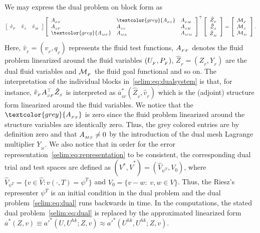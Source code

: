 We may express the dual problem on block form as
\begin{eqnarray}
\label{selim:eq:dualsystem}
\left[\begin{array}{ccc} \hat{v}_{_{F}} & \hat{v}_{_{S}} & \hat{v}_{_{M}}
  \end{array} \right]
\left[\begin{array}{lll} \AFF & \textcolor{grey}{\AFS} & \AFM
    \\ \ASF & \ASS & \ASM \\ \textcolor{grey}{\AMF} & \AMS &
    \AMM
\end{array} \right]^{\top}
\left[ \begin{array}{c} \hat{Z}_{_{F}} \\ \hat{Z}_{_{S}}
    \\ \hat{Z}_{_{M}} \end{array} \right] =\left[ \begin{array}{l}
    \M_{_{F}}\\ \M_{{_S}}\\ \M_{_{M}} \end{array} \right].
\end{eqnarray}
Here, $\hat{v}_{_{F}} = (v_{_{F}}, q_{_{F}})$ represents the fluid
test functions, $A_{_{FF}}$ denotes the fluid problem linearized around the
fluid variables $(U_{_{F}},P_{_{F}})$, $\hat{Z}_{_{F}} = (Z_{_{F}}, Y_{_{F}})$
are the dual fluid variables and $\mathcal{M}_{_{F}}$ the fluid goal functional
and so on. The interpretation of the individual blocks
in~\eqref{selim:eq:dualsystem} is that, for instance,
$\hat{v}_{_{F}}A_{_{SF}}^{\top}\hat{Z}_{_{S}} $ is interpreted as
$\overline{a}^*_{_{SF}}(\hat{Z}_{_{S}}, \hat{v}_{_{F}})$ which is the
(adjoint) structure form linearized around the fluid variables.  We
notice that the $\textcolor{grey}{\AFS}$ is zero since the fluid
problem linearized around the structure variables are identically
zero. Thus, the grey colored entries are by definition zero and that
$A_{_{MS}} \neq 0$ by the introduction of the dual mesh Lagrange multiplier
$Y_{_{M}}$. We also notice that in order for the error
representation~\eqref{selim:eq:representation} to be consistent, the
corresponding dual trial and test spaces are defined as $(V^*,
\hat{V}^*)=(\hat{V}_{\psi^T}, V_0)$, where $\hat{V}_{\psi^T} = \{v\in
\hat{V} : v(\cdot, T) = \psi^T \}$ and $V_0 = \{v-w:\;v,w\in V
\}$. Thus, the Riesz's representer $\psi^T$ is an initial condition in
the dual problem and the dual problem~\eqref{selim:eq:dual} runs
backwards in time. In the computations, the stated dual
problem~\eqref{selim:eq:dual} is replaced by the approximated
linearized form $\overline{a}^{*}(Z, v) \equiv a'^{*}(U,U^{hk}; Z, v)
\approx a'^{*}(U^{hk}, U^{hk}; Z, v) $.

